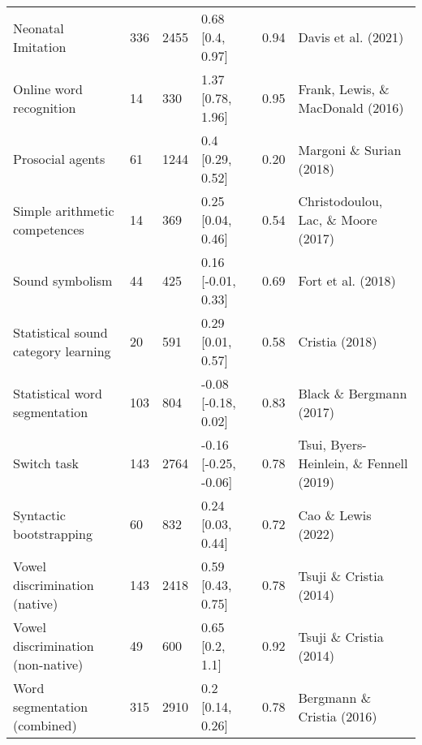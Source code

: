 \documentclass[
  man]{apa6}
\newenvironment{lltable}{\begin{landscape}\centering\begin{ThreePartTable}}{\end{ThreePartTable}\end{landscape}}
\begin{document}
\begin{lltable}
\begin{longtable}{llllll}
Neonatal Imitation & 336 & 2455 & 0.68 [0.4, 0.97] & 0.94 & Davis et al. (2021)\\
Online word recognition & 14 & 330 & 1.37 [0.78, 1.96] & 0.95 & Frank, Lewis, \& MacDonald (2016)\\
Prosocial agents & 61 & 1244 & 0.4 [0.29, 0.52] & 0.20 & Margoni \& Surian (2018)\\
Simple arithmetic competences & 14 & 369 & 0.25 [0.04, 0.46] & 0.54 & Christodoulou, Lac, \& Moore (2017)\\
Sound symbolism & 44 & 425 & 0.16 [-0.01, 0.33] & 0.69 & Fort et al. (2018)\\
Statistical sound category learning & 20 & 591 & 0.29 [0.01, 0.57] & 0.58 & Cristia (2018)\\
Statistical word segmentation & 103 & 804 & -0.08 [-0.18, 0.02] & 0.83 & Black \& Bergmann (2017)\\
Switch task & 143 & 2764 & -0.16 [-0.25, -0.06] & 0.78 & Tsui, Byers-Heinlein, \& Fennell (2019)\\
Syntactic bootstrapping & 60 & 832 & 0.24 [0.03, 0.44] & 0.72 & Cao \& Lewis (2022)\\
Vowel discrimination (native) & 143 & 2418 & 0.59 [0.43, 0.75] & 0.78 & Tsuji \& Cristia (2014)\\
Vowel discrimination (non-native) & 49 & 600 & 0.65 [0.2, 1.1] & 0.92 & Tsuji \& Cristia (2014)\\
Word segmentation (combined) & 315 & 2910 & 0.2 [0.14, 0.26] & 0.78 & Bergmann \& Cristia (2016)\\
\bottomrule
\end{longtable}

\end{lltable}
\end{document}
